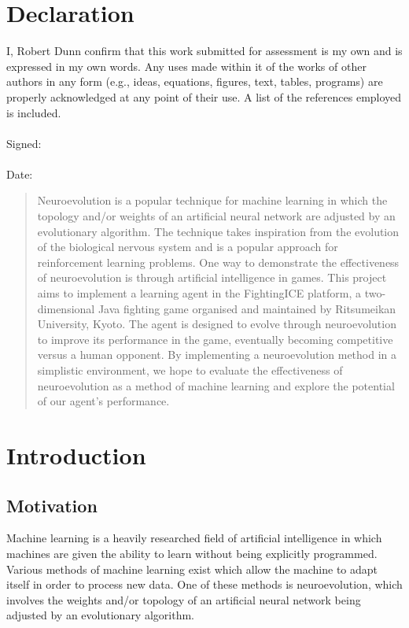 \documentclass[11pt,a4paper]{article}
\begin{document}
\section*{Declaration}
I,  Robert Dunn confirm that this work submitted for assessment is my own and is expressed
in my own words. Any uses made within it of the works of other authors in any
form (e.g., ideas, equations, figures, text, tables, programs) are properly acknowledged
at any point of their use. A list of the references employed is included.\\
\\
Signed:\\
\\
Date: 
\newpage
\thispagestyle{empty}
\begin{abstract}
Neuroevolution is a popular technique for machine learning in which the topology and/or weights of an artificial neural network are adjusted by an evolutionary algorithm. The technique takes inspiration from the evolution of the biological nervous system and is a popular approach for reinforcement learning problems. One way to demonstrate the effectiveness of neuroevolution is through artificial intelligence in games. This project aims to implement a learning agent in the FightingICE platform, a two-dimensional Java fighting game organised and maintained by Ritsumeikan University, Kyoto. The agent is designed to evolve through neuroevolution to improve its performance in the game, eventually becoming competitive versus a human opponent. By implementing a neuroevolution method in a simplistic environment, we hope to evaluate the effectiveness of neuroevolution as a method of machine learning and explore the potential of our agent's performance.
\end{abstract}
\newpage
\thispagestyle{empty}
\tableofcontents
\newpage
\section{Introduction}
\subsection{Motivation}
Machine learning is a heavily researched field of artificial intelligence in which machines are given the ability to learn without being explicitly programmed. Various methods of machine learning exist which allow the machine to adapt itself in order to process new data. One of these methods is neuroevolution, which involves the weights and/or topology of an artificial neural network being adjusted by an evolutionary algorithm.\\
\end{document}
